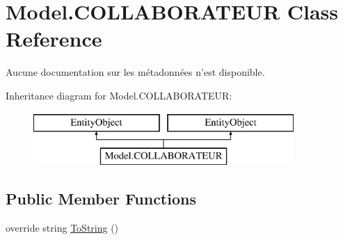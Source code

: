 \hypertarget{class_model_1_1_c_o_l_l_a_b_o_r_a_t_e_u_r}{\section{Model.\-C\-O\-L\-L\-A\-B\-O\-R\-A\-T\-E\-U\-R Class Reference}
\label{class_model_1_1_c_o_l_l_a_b_o_r_a_t_e_u_r}
}


Aucune documentation sur les métadonnées n'est disponible.  


Inheritance diagram for Model.\-C\-O\-L\-L\-A\-B\-O\-R\-A\-T\-E\-U\-R\-:\begin{figure}[H]
\begin{center}
\leavevmode
\includegraphics[height=2.000000cm]{class_model_1_1_c_o_l_l_a_b_o_r_a_t_e_u_r}
\end{center}
\end{figure}
\subsection*{Public Member Functions}
\begin{DoxyCompactItemize}
\item 
override string \hyperlink{class_model_1_1_c_o_l_l_a_b_o_r_a_t_e_u_r_add667e8008b34fe3e807452e8bfa6ef0}{To\-String} ()
\end{DoxyCompactItemize}
